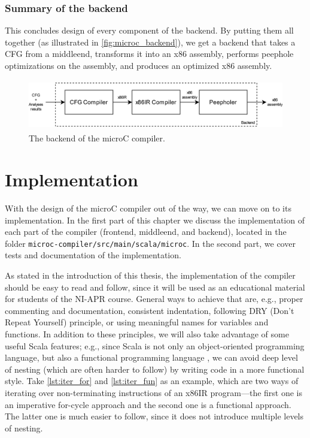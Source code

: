 \documentclass[thesis=M,english]{FITthesis}[2019/12/23]
\begin{document}
\subsection{Summary of the backend}\label{ssec:backend_design_summary}
This concludes design of every component of the backend. By putting them all together (as illustrated in \autoref{fig:microc_backend}), we get a backend that takes a CFG from a middleend, transforms it into an x86 assembly, performs peephole optimizations on the assembly, and produces an optimized x86 assembly.

\begin{figure}
    \centering
    \includegraphics[height=2.2cm]{img/microc_backend.png}
    \caption{The backend of the microC compiler.}\label{fig:microc_backend}
\end{figure}

\chapter{Implementation}
With the design of the microC compiler out of the way, we can move on to its implementation. In the first part of this chapter we discuss the implementation of each part of the compiler (frontend, middleend, and backend), located in the folder \texttt{microc-compiler/src/main/scala/microc}. In the second part, we cover tests and documentation of the implementation.

As stated in the introduction of this thesis, the implementation of the compiler should be easy to read and follow, since it will be used as an educational material for students of the NI-APR course. General ways to achieve that are, e.g., proper commenting and documentation, consistent indentation, following DRY (Don't Repeat Yourself) principle, or using meaningful names for variables and functions. In addition to these principles, we will also take advantage of some useful Scala features; e.g., since Scala is not only an object-oriented programming language, but also a functional programming language \cite[Chap. 1.2]{scala}, we can avoid deep level of nesting (which are often harder to follow) by writing code in a more functional style. Take \autoref{lst:iter_for} and \autoref{lst:iter_fun} as an example, which are two ways of iterating over non-terminating instructions of an x86IR program---the first one is an imperative for-cycle approach and the second one is a functional approach. The latter one is much easier to follow, since it does not introduce multiple levels of nesting.
\end{document}
